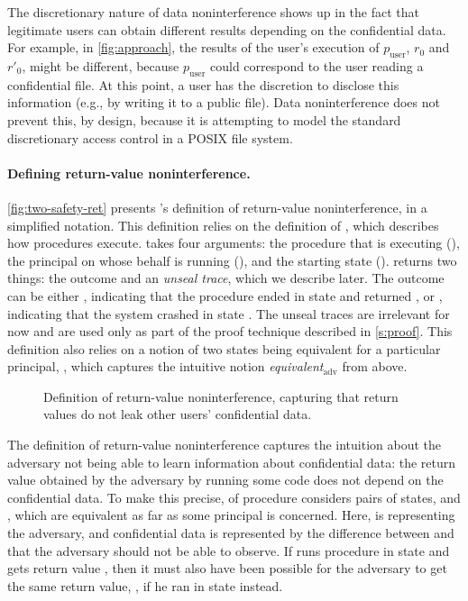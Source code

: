 The discretionary nature of data noninterference shows up in the fact
that legitimate users can obtain different results depending on the
confidential data.  For example, in \autoref{fig:approach}, the results
of the user's execution of $p_\mathrm{user}$, $r_0$ and $r'_0$, might be
different, because $p_\mathrm{user}$ could correspond to the user reading
a confidential file.  At this point, a user has the discretion to disclose this information
(e.g., by writing it to a public file).  Data noninterference does not
prevent this, by design, because it is attempting to model the standard
discretionary access control in a POSIX file system.


\paragraph{Defining return-value noninterference.}

\autoref{fig:two-safety-ret} presents \sys's definition of return-value
noninterference, in a simplified notation.  This definition relies on
the definition of , which describes how procedures execute.
 takes four arguments: the procedure that is executing (),
the principal on whose behalf  is running (), and the starting
state ().
 returns two things: the outcome and an \emph{unseal trace},
which we describe later.
The outcome can be either , indicating that the
procedure ended in state  and returned , or
, indicating that the system crashed in state .
The unseal traces are irrelevant for now and are used only as part of the
proof technique described in \autoref{s:proof}.
This definition also relies on a notion of two states being equivalent for
a particular principal, , which captures
the intuitive notion \emph{equivalent}$_\mathrm{adv}$ from above.

\begin{figure}[ht]
  
  \caption{Definition of return-value noninterference, capturing that
    return values do not leak other users' confidential data.}
  \label{fig:two-safety-ret}
\end{figure}

The definition of return-value noninterference captures the intuition
about the adversary not being able to learn information about confidential
data: the return value obtained by the adversary by running some
code does not depend on the confidential data.  To make this precise,
 of procedure  considers pairs of states,
 and , which are equivalent as far as some principal
 is concerned.  Here,  is representing the adversary, and
confidential data is represented by the difference between  and
 that the adversary should not be able to observe.  If 
runs procedure  in state  and gets return value ,
then it must also have been possible for the adversary to get the same
return value, , if he ran  in state  instead.



